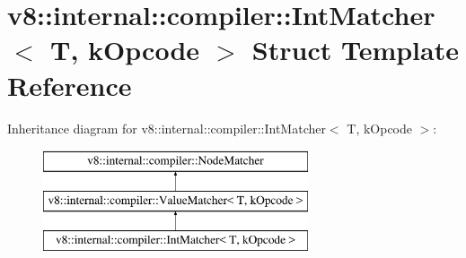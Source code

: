 \hypertarget{structv8_1_1internal_1_1compiler_1_1IntMatcher}{}\section{v8\+:\+:internal\+:\+:compiler\+:\+:Int\+Matcher$<$ T, k\+Opcode $>$ Struct Template Reference}
\label{structv8_1_1internal_1_1compiler_1_1IntMatcher}
Inheritance diagram for v8\+:\+:internal\+:\+:compiler\+:\+:Int\+Matcher$<$ T, k\+Opcode $>$\+:\begin{figure}[H]
\begin{center}
\leavevmode
\includegraphics[height=3.000000cm]{structv8_1_1internal_1_1compiler_1_1IntMatcher}
\end{center}
\end{figure}
